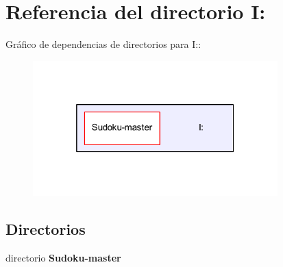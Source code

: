 \section{Referencia del directorio I\-:}
\label{dir_6d1a1c7eebc0e8400c6ecef005e046f8}
Gráfico de dependencias de directorios para I\-:\-:
\nopagebreak
\begin{figure}[H]
\begin{center}
\leavevmode
\includegraphics[width=268pt]{dir_6d1a1c7eebc0e8400c6ecef005e046f8_dep}
\end{center}
\end{figure}
\subsection*{Directorios}
\begin{DoxyCompactItemize}
\item 
directorio {\bf Sudoku-\/master}
\end{DoxyCompactItemize}
